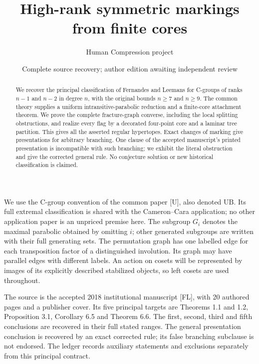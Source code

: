 
\title{High-rank symmetric markings from finite cores}
\author{Human Compression project}
\date{Complete source recovery; author edition awaiting independent review}
\maketitle
\begin{abstract}
We recover the principal classification of Fernandes and Leemans for
C-groups of ranks $n-1$ and $n-2$ in degree $n$, with the original
bounds $n\geq7$ and $n\geq9$. The common theory supplies a uniform
intransitive-parabolic reduction and a finite-core attachment theorem.
We prove the complete fracture-graph converse, including the local
splitting obstructions, and realize every flag by a decorated four-point
core and a laminar tree partition. This gives all the asserted regular
hypertopes. Exact changes of marking give presentations for arbitrary
branching. One clause of the accepted manuscript's printed presentation
is incompatible with such branching; we exhibit the literal obstruction
and give the corrected general rule. No conjecture solution or new
historical classification is claimed.
\end{abstract}
We use the C-group convention of the common paper [U], also denoted UB. Its full extremal classification is shared with the Cameron--Cara application; no other application paper is an unpriced premise here. The subgroup $G_i$ denotes the maximal parabolic obtained by omitting
$i$; other generated subgroups are written with their full generating
sets. The permutation graph has one labelled edge for
each transposition factor of a distinguished involution. Its graph
may have parallel edges with different labels. An action on cosets
will be represented by images of its explicitly described stabilized
objects, so left cosets are used throughout.

The source is the accepted 2018 institutional manuscript [FL], with
20 authored pages and a publisher cover. Its five principal targets are
Theorems 1.1 and 1.2, Proposition 3.1, Corollary 6.5 and Theorem 6.6.
The first, second, third and fifth conclusions are recovered in their
full stated ranges. The general presentation conclusion is recovered
by an exact corrected rule; its false branching subclause is not
endorsed. The ledger records auxiliary statements and exclusions
separately from this principal contract.







